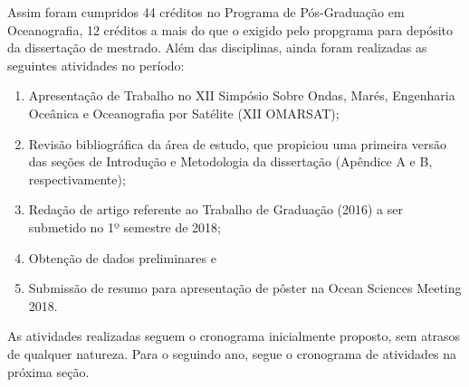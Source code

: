 \bigskip

\hspace{5mm} Assim foram cumpridos 44 créditos no Programa de Pós-Graduação em Oceanografia, 12 créditos a mais do que o exigido pelo propgrama para depósito da dissertação de mestrado. Além das disciplinas, ainda foram realizadas as seguintes atividades no período:

\vspace{-\topsep}
\begin{enumerate}[noitemsep]
    \item Apresentação de Trabalho no XII Simpósio Sobre Ondas, Marés, Engenharia Oceânica e Oceanografia por Satélite (XII OMARSAT);
    \item Revisão bibliográfica da área de estudo, que propiciou uma primeira versão das seções de Introdução e Metodologia da dissertação (Apêndice A e B, respectivamente);
    \item Redação de artigo referente ao Trabalho de Graduação (2016) a ser submetido no 1º semestre de 2018;
    \item Obtenção de dados preliminares e
    \item Submissão de resumo para apresentação de pôster na Ocean Sciences Meeting 2018.
\end{enumerate}

\hspace{5mm} As atividades realizadas seguem o cronograma inicialmente proposto, sem atrasos de qualquer natureza. Para o seguindo ano, segue o cronograma de atividades na próxima seção.